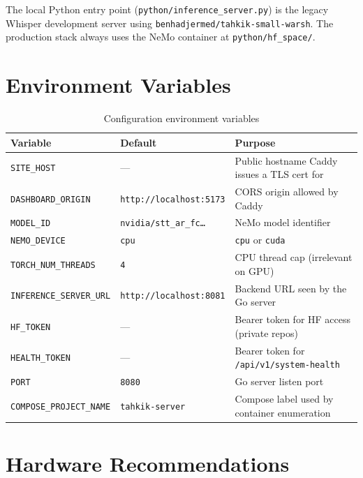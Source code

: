 The local Python entry point (\texttt{python/inference\_server.py}) is the legacy Whisper development server using \texttt{benhadjermed/tahkik-small-warsh}. The production stack always uses the NeMo container at \texttt{python/hf\_space/}.

\section{Environment Variables}

\begin{table}[H]
  \centering
  \caption{Configuration environment variables}
  \label{tab:env_vars}
  \renewcommand{\arraystretch}{1.3}
  \begin{tabular}{llp{5.5cm}}
    \toprule
    \textbf{Variable} & \textbf{Default} & \textbf{Purpose} \\
    \midrule
    \texttt{SITE\_HOST}             & ---                                 & Public hostname Caddy issues a TLS cert for \\
    \texttt{DASHBOARD\_ORIGIN}      & \texttt{http://localhost:5173}      & CORS origin allowed by Caddy \\
    \texttt{MODEL\_ID}              & \texttt{nvidia/stt\_ar\_fc\dots}    & NeMo model identifier \\
    \texttt{NEMO\_DEVICE}           & \texttt{cpu}                        & \texttt{cpu} or \texttt{cuda} \\
    \texttt{TORCH\_NUM\_THREADS}    & \texttt{4}                          & CPU thread cap (irrelevant on GPU) \\
    \texttt{INFERENCE\_SERVER\_URL} & \texttt{http://localhost:8081}      & Backend URL seen by the Go server \\
    \texttt{HF\_TOKEN}              & ---                                 & Bearer token for HF access (private repos) \\
    \texttt{HEALTH\_TOKEN}          & ---                                 & Bearer token for \texttt{/api/v1/system-health} \\
    \texttt{PORT}                   & \texttt{8080}                       & Go server listen port \\
    \texttt{COMPOSE\_PROJECT\_NAME} & \texttt{tahkik-server}              & Compose label used by container enumeration \\
    \bottomrule
  \end{tabular}
\end{table}

\section{Hardware Recommendations}

